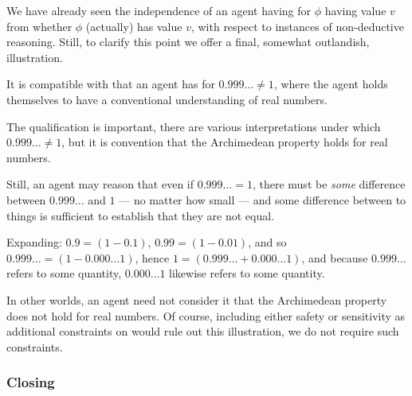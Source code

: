 \begin{note}
  We have already seen the independence of an agent having \support{} for \(\phi\) having value \(v\) from whether \(\phi\) (actually) has value \(v\), with respect to instances of non-deductive reasoning.
  Still, to clarify this point we offer a final, somewhat outlandish, illustration.

  \begin{illustration}
    It is compatible with \ideaS{} that an agent has \support{} for \(0.999\dots \ne 1\), where the agent holds themselves to have a conventional understanding of real numbers.
  \end{illustration}
  The qualification is important, there are various interpretations under which \(0.999\dots \ne 1\), but it is convention that the Archimedean property holds for real numbers.

  Still, an agent may reason that even if \(0.999\dots = 1\), there must be \emph{some} difference between \(0.999\dots\) and \(1\) --- no matter how small --- and some difference between to things is sufficient to establish that they are not equal.

  Expanding: \(0.9 = (1 - 0.1)\), \(0.99 = (1 - 0.01)\), and so \(0.999\dots = (1 - 0.000\dots 1)\), hence \(1 = (0.999\dots + 0.000\dots 1)\), and because \(0.999\dots\) refers to some quantity, \(0.000\dots 1\) likewise refers to some quantity.

  In other worlds, an agent need not consider it \epPAd{} that the Archimedean property does not hold for real numbers.
  Of course, including either safety or sensitivity as additional constraints on \support{} would rule out this illustration, we do not require such constraints.
\end{note}

\subsubsection{Closing \ideaS{}}
\label{sec:ideaS:closing}

